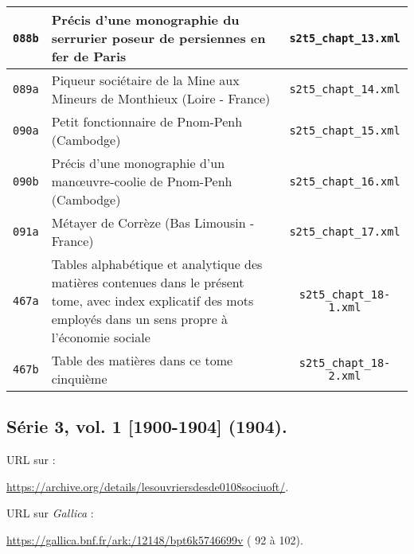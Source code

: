 \begin{center}
\begin{longtable}{ | c | p{9.5cm} | c | }
\texttt{088b} & Précis d'une monographie du serrurier poseur de persiennes en fer de Paris & \texttt{s2t5\_chapt\_13.xml} \\ \hline
\texttt{089a} & Piqueur sociétaire de la Mine aux Mineurs de Monthieux (Loire - France) & \texttt{s2t5\_chapt\_14.xml} \\ \hline
\texttt{090a} & Petit fonctionnaire de Pnom-Penh (Cambodge) & \texttt{s2t5\_chapt\_15.xml} \\ \hline
\texttt{090b} & Précis d'une monographie d'un manœuvre-coolie de Pnom-Penh (Cambodge) & \texttt{s2t5\_chapt\_16.xml} \\ \hline
\texttt{091a} & Métayer de Corrèze (Bas Limousin - France) & \texttt{s2t5\_chapt\_17.xml} \\ \hline
\texttt{467a} & Tables alphabétique et analytique des matières contenues dans le présent tome, avec index explicatif des mots employés dans un sens propre à l'économie sociale & \texttt{s2t5\_chapt\_18-1.xml} \\ \hline
\texttt{467b} & Table des matières dans ce tome cinquième & \texttt{s2t5\_chapt\_18-2.xml} \\ \hline
\end{longtable}
\end{center}

\subsection{Série 3, vol. 1 [1900-1904] (1904).}
\label{mappings3t1}

URL sur \ia{} : 

\url{https://archive.org/details/lesouvriersdesde0108sociuoft/}.

URL sur \textit{Gallica} : 

\url{https://gallica.bnf.fr/ark:/12148/bpt6k5746699v} (\no{} 92 à 102).

